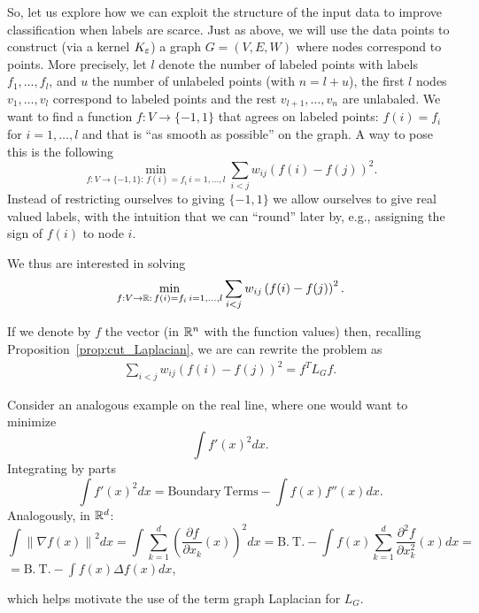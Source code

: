 So, let us explore how we can exploit the structure of the input data to improve classification when labels are scarce.
Just as above, we will use the data points to construct (via a kernel $K_\varepsilon$) a graph $G=(V,E,W)$ where nodes correspond to points. More precisely, let $l$ denote the number of labeled points with labels $f_1,\dots,f_l$, and $u$ the number of unlabeled points (with $n=l+u$), the first $l$ nodes $v_1,\dots,v_l$ correspond to labeled points and the rest $v_{l+1},\dots,v_n$ are unlabaled. We want to find a function $f:V\to \{-1,1\}$ that agrees on labeled points: $f(i)=f_i$ for $i=1,\dots,l$ and that is ``as smooth as possible'' on the graph. A way to pose this is the following \cite{zhu2003semi} 
\[
 \min_{f:V\to \{-1,1\}:\, f(i)=f_i\, i=1,\dots,l} \sum_{i<j}w_{ij}\left( f(i) - f(j) \right)^2.
\]
Instead of restricting ourselves to giving $\{-1,1\}$ we allow ourselves to give real valued labels, with the intuition that we can ``round'' later by, e.g., assigning the sign of $f(i)$ to node $i$.

We thus are interested in solving
\[
 \min_{f:V\to \mathbb{R}:\, f(i)=f_i\, i=1,\dots,l} \sum_{i<j}w_{ij}\left( f(i) - f(j) \right)^2.
\]

If we denote by $f$ the vector (in $\mathbb{R}^n$ with the function values) then, recalling Proposition~\ref{prop:cut_Laplacian}, we are can rewrite the problem as
\begin{eqnarray*}
 \sum_{i<j}w_{ij}\left( f(i) - f(j) \right)^2 
= f^TL_Gf.
\end{eqnarray*}



\begin{remark}
 Consider an analogous example on the real line, where one would want to minimize
 \[
  \int f'(x)^2 dx.
 \]
Integrating by parts
\[
 \int f'(x)^2 dx = \mathrm{Boundary\ Terms} - \int f(x)f''(x)dx.
\]
Analogously, in $\mathbb{R}^d$:
\[
 \int \left\|\nabla f(x)\right\|^2 dx =  \int \sum_{k=1}^d \left( \frac{\partial f}{\partial x_k}(x) \right)^2 dx = \mathrm{B.\ T.} - \int f(x) \sum_{k=1}^d \frac{\partial^2 f}{\partial x_k^2}(x)dx =
 \]
 $\displaystyle{= \mathrm{B.\ T.} - \int f(x) \Delta f(x) dx}$,

which helps motivate the use of the term graph Laplacian for $L_G$.
\end{remark}

